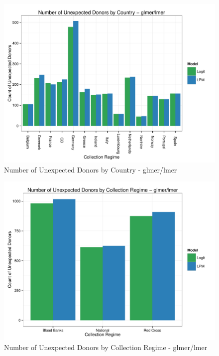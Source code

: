 \documentclass[11pt,article,oneside]{memoir}
\begin{document}


\begin{landscape}

\end{landscape}
\restoregeometry







\begin{figure}[h]
\centering
\includegraphics[width=6in]{figures/unexpcount.pdf}
\caption{Number of Unexpected Donors by Country - glmer/lmer\label{fig:countries}}
\end{figure}

\begin{figure}[h]
\centering
\includegraphics[width=6in]{figures/unexpcr.pdf}
\caption{Number of Unexpected Donors by Collection Regime - glmer/lmer\label{fig:colreg}}
\end{figure}
\end{document}
